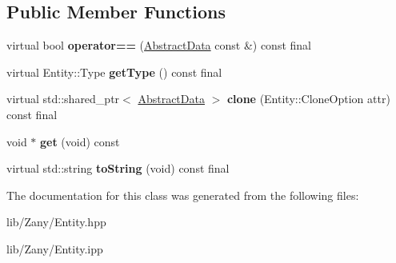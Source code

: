 \subsection*{Public Member Functions}
\begin{DoxyCompactItemize}
\item 
\mbox{\label{classzany_1_1_null_a0fa6f27bc9852ae96465baa33d2ba790}} 
virtual bool {\bfseries operator==} (\hyperlink{classzany_1_1_abstract_data}{Abstract\+Data} const \&) const final
\item 
\mbox{\label{classzany_1_1_null_aa74e45f5f1e3ed386df35e60171e0f5c}} 
virtual Entity\+::\+Type {\bfseries get\+Type} () const final
\item 
\mbox{\label{classzany_1_1_null_a9fe8f1975b438abe2288c89d8af71732}} 
virtual std\+::shared\+\_\+ptr$<$ \hyperlink{classzany_1_1_abstract_data}{Abstract\+Data} $>$ {\bfseries clone} (Entity\+::\+Clone\+Option attr) const final
\item 
\mbox{\label{classzany_1_1_null_a94691b923388e622d77ab5ab205d69c4}} 
void $\ast$ {\bfseries get} (void) const
\item 
\mbox{\label{classzany_1_1_null_a2c406907da941d5e4e0b4ff3d13c4887}} 
virtual std\+::string {\bfseries to\+String} (void) const final
\end{DoxyCompactItemize}


The documentation for this class was generated from the following files\+:\begin{DoxyCompactItemize}
\item 
lib/\+Zany/Entity.\+hpp\item 
lib/\+Zany/Entity.\+ipp\end{DoxyCompactItemize}
